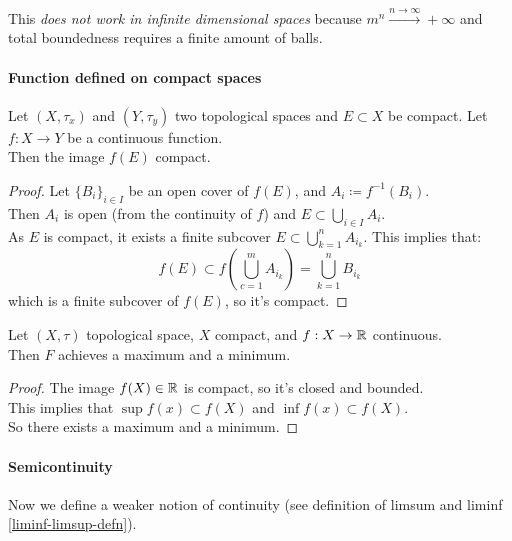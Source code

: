 This \textit{does not work in infinite dimensional spaces} because $m^n \xrightarrow{n\to\infty} + \infty$ and total boundedness requires a finite amount of balls.

\paragraph{Function defined on compact spaces}

\begin{prop}
	Let $(X, \tau_x)$ and $(Y, \tau_y)$ two topological spaces and $E \subset X$ be compact. Let $f:X\to Y$ be a continuous function.\\
	Then the image $f(E)$ compact.
\end{prop}
\begin{proof}
	Let $\{ B_i \}_{i \in I}$ be an open cover of $f(E)$, and $A_i \coloneqq f^{-1}(B_i)$.\\
	Then $A_i$ is open (from the continuity of $f$) and $E \subset \bigcup_{i \in I}A_i$.\\
	As $E$ is compact, it exists a finite subcover $E\subset \bigcup_{k=1}^{n} A_{i_k}$. This implies that:
	$$f(E) \subset f\left(\bigcup_{c=1}^m A_{i_k} \right) = \bigcup_{k=1}^n B_{i_k}$$
	which is a finite subcover of $f(E)$, so it's compact.
\end{proof}

\begin{theo}[Weierstrass]
	Let $(X, \tau)$ topological space, $X$ compact, and $f:X \to \mathbb R$ continuous.\\
	Then $F$ achieves a maximum and a minimum.
\end{theo}
\begin{proof}
	The image $f(X) \in \mathbb R$ is compact, so it's closed and bounded.\\
	This implies that $\sup f(x) \subset f(X)$ and $\inf f(x) \subset f(X)$.\\
	So there exists a maximum and a minimum.
\end{proof}

\paragraph{Semicontinuity} Now we define a weaker notion of continuity (see definition of limsum and liminf \vref{liminf-limsup-defn}).

